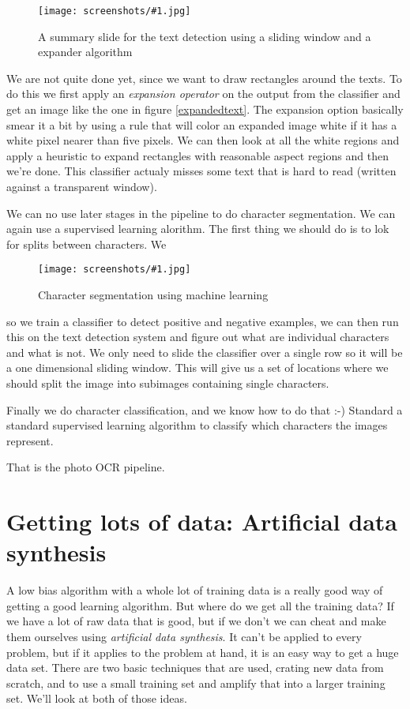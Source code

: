 \documentclass[a4, 12pt, english, USenglish]{scrreprt}
\newcommand{\screenshot}[2]{
\begin{figure}[htb]
\texttt{[image: screenshots/\#1.jpg]}
\label{#1}
\caption{#2}
\end{figure}}
\newcommand{\idx}[1]{{\em #1}\index{#1}}
\begin{document}
\screenshot{classifiersummary}{A summary slide for the text detection
  using a sliding window and a expander algorithm}

We are not quite done yet, since we want to draw rectangles around the
texts.  To do this we first apply an \idx{expansion operator} on the output
from the classifier and get an image like the one in figure
\ref{expandedtext}.  The expansion option basically smear it a bit by
using  a rule that will color an expanded image white if it has a
white pixel nearer than five pixels.  We can then look at all the
white regions and apply a heuristic to expand rectangles with
reasonable aspect regions and then we're done.  This classifier
actualy misses some text that is hard to read (written against a
transparent window).

We can no use later stages in the pipeline to do character
segmentation.   We can again use a supervised learning alorithm.  The
first thing we should do is to lok for splits between characters.  We 

\screenshot{charactersegmentation}{Character segmentation using
  machine learning}

so we train a classifier to detect positive and negative examples, we
can then run this on the text detection system and figure out what are
individual characters and what is not.   We only need to slide the
classifier over a single row so it will be a one dimensional sliding
window.  This will give us a set of locations where we should split
the image into subimages containing single characters.

Finally we do character classification, and we know how to do that :-)
Standard a standard supervised learning algorithm to classify which
characters the images represent.

That is the photo OCR pipeline.

\section{Getting lots of data: Artificial data synthesis}

A low bias algorithm with a whole lot of training data is a really
good way of getting a good learning algorithm.  But where do we get
all the training data? If we have a lot of raw data that is good, but
if we don't we can cheat and make them ourselves using \idx{artificial
  data synthesis}.   It can't be applied to every problem, but if it
applies to the problem at hand, it is an easy way to get a huge data
set.   There are two basic techniques that are used, crating new data
from scratch, and to use a small training set and amplify that into a
larger training set.  We'll look at both of those ideas.
\end{document}
